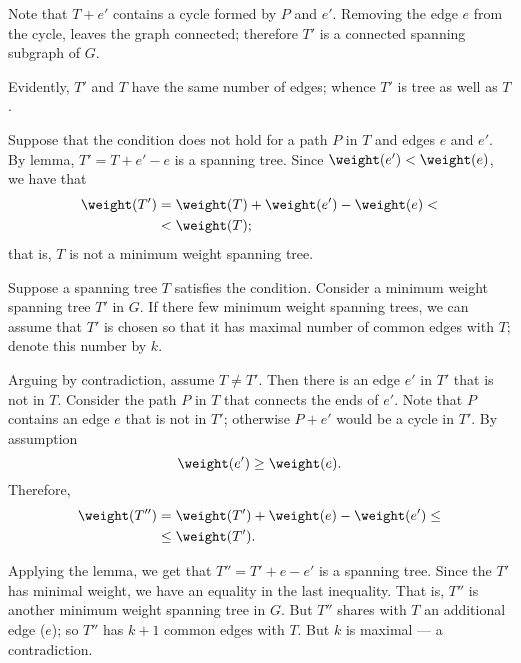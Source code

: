 Note that $T+e'$ contains a cycle formed by $P$ and $e'$.
Removing the edge $e$ from the cycle, leaves the graph connected;
therefore $T'$ is a connected spanning subgraph of $G$.

Evidently, $T'$ and $T$ have the same number of edges; whence $T'$ is tree as well as $T$.
\qeds


Suppose that the condition does not hold for a path $P$ in $T$ and edges $e$ and $e'$.
By lemma, $T'=T+e'-e$ is a spanning tree.
Since $\weight(e')<\weight(e)$, we have that
\begin{align*}
\weight(T')&=\weight(T)+\weight(e')-\weight(e)<
\\
&<\weight(T);
\end{align*}
that is, $T$ is not a minimum weight spanning tree.

Suppose a spanning tree $T$ satisfies the condition.
Consider a minimum weight spanning tree $T'$ in $G$.
If there few minimum weight spanning trees, we can assume that $T'$ is chosen so that it has maximal number of common edges with $T$; denote this number by $k$.

Arguing by contradiction, assume $T\ne T'$.
Then there is an edge $e'$ in $T'$ that is not in $T$.
Consider the path $P$ in $T$ that connects the ends of $e'$.
Note that $P$ contains an edge $e$ that is not in $T'$;
otherwise $P+e'$ would be a cycle in $T'$. 
By assumption 
\[\weight(e')\ge \weight(e).\]
Therefore, 
\begin{align*}
\weight(T'')&=\weight(T')+\weight(e)-\weight(e')\le
\\
&\le\weight(T').
\end{align*}

Applying the lemma, we get that $T''=T'+e-e'$ is a spanning tree.
Since the $T'$ has minimal weight, we have an equality in the last inequality.
That is, $T''$ is another minimum weight spanning tree in $G$.
But $T''$ shares with $T$ an additional edge ($e$);
so $T''$ has $k+1$ common edges with $T$.
But $k$ is maximal --- a contradiction.
\qeds

